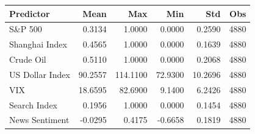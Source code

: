 \begin{tabular}{lrrrrr} \toprule
Predictor & Mean & Max & Min & Std & Obs \\ \midrule
S\&P 500 & 0.3134 & 1.0000 & 0.0000 & 0.2590 & 4880 \\ 
Shanghai Index & 0.4565 & 1.0000 & 0.0000 & 0.1639 & 4880 \\ 
Crude Oil & 0.5110 & 1.0000 & 0.0000 & 0.2068 & 4880 \\ 
US Dollar Index & 90.2557 & 114.1100 & 72.9300 & 10.2696 & 4880 \\ 
VIX & 18.6595 & 82.6900 & 9.1400 & 6.2426 & 4880 \\ 
Search Index & 0.1956 & 1.0000 & 0.0000 & 0.1454 & 4880 \\ 
News Sentiment & -0.0295 & 0.4175 & -0.6658 & 0.1819 & 4880 \\ 
\bottomrule \end{tabular}